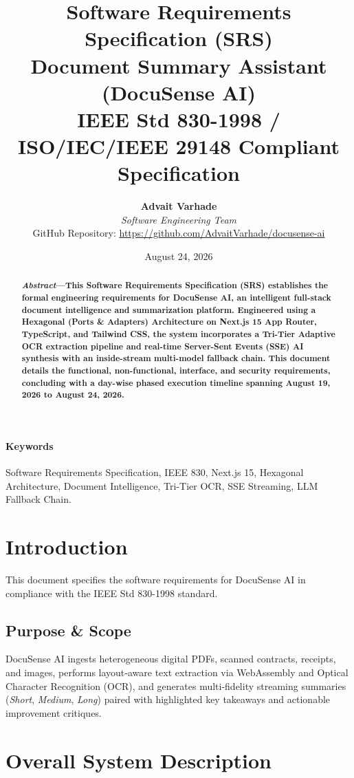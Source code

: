 \documentclass[10pt,twocolumn,a4paper]{article}
\title{\textbf{Software Requirements Specification (SRS)}\\\large Document Summary Assistant (DocuSense AI)\\\normalsize IEEE Std 830-1998 / ISO/IEC/IEEE 29148 Compliant Specification}
\author{\textbf{Advait Varhade}\\
\textit{Software Engineering Team}\\
GitHub Repository: \url{https://github.com/AdvaitVarhade/docusense-ai}}
\date{August 24, 2026}
\begin{document}
\maketitle

\begin{abstract}
\textbf{\textit{Abstract}---This Software Requirements Specification (SRS) establishes the formal engineering requirements for \textbf{DocuSense AI}, an intelligent full-stack document intelligence and summarization platform. Engineered using a \textbf{Hexagonal (Ports \& Adapters) Architecture} on Next.js 15 App Router, TypeScript, and Tailwind CSS, the system incorporates a Tri-Tier Adaptive OCR extraction pipeline and real-time Server-Sent Events (SSE) AI synthesis with an inside-stream multi-model fallback chain. This document details the functional, non-functional, interface, and security requirements, concluding with a day-wise phased execution timeline spanning August 19, 2026 to August 24, 2026.}
\end{abstract}

\paragraph{Keywords}
Software Requirements Specification, IEEE 830, Next.js 15, Hexagonal Architecture, Document Intelligence, Tri-Tier OCR, SSE Streaming, LLM Fallback Chain.

\section{Introduction}
This document specifies the software requirements for DocuSense AI in compliance with the IEEE Std 830-1998 standard.

\subsection{Purpose \& Scope}
DocuSense AI ingests heterogeneous digital PDFs, scanned contracts, receipts, and images, performs layout-aware text extraction via WebAssembly and Optical Character Recognition (OCR), and generates multi-fidelity streaming summaries (\textit{Short}, \textit{Medium}, \textit{Long}) paired with highlighted key takeaways and actionable improvement critiques.

\section{Overall System Description}
\end{document}
